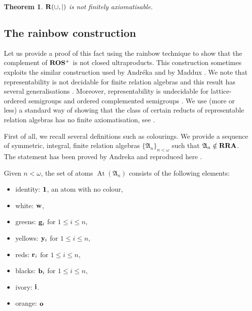\documentclass[a4paper]{article}
\theoremstyle{defin}
\theoremstyle{theorem}
\newtheorem{theorem}{Theorem}
\theoremstyle{prop}
\theoremstyle{lemma}
\theoremstyle{ex}
\theoremstyle{col}
\theoremstyle{claim}
\begin{document}
\begin{theorem}
  ${\bf R}(\cup, |)$ is not finitely axiomatisable.
\end{theorem}

\subsection{The rainbow construction}

Let us provide a proof of this fact using the rainbow technique \cite{hirsch2002relation} to show that the complement of ${\bf ROS^{+}}$ is not closed ultraproducts. This construction sometimes exploits the similar construction used by Andr{\'e}ka \cite{andreka1991representations} and by Maddux \cite{maddux_1989}.
We note that representability is not decidable for finite relation algebras \cite{hirsch2001representability} and this result has several generalisations \cite{hirsch2012undecidability}. Moreover, representability is undecidable for lattice-ordered semigroups and ordered complemented semigroups \cite{neuzerling2016undecidability}. We use (more or less) a standard way of showing that the class of certain reducts of representable relation algebras has no finite axiomatisation, see \cite{hodkinson2000axiomatizability} \cite{hirsch1997step}.

First of all, we recall several definitions such as colourings. We provide a sequence of symmetric, integral, finite relation algebras $\{ \mathfrak{A}_n \}_{n < \omega}$ such that $\mathfrak{A}_n \notin {\bf RRA}$. The statement has been proved by Andreka \cite{andreka1991representations} and reproduced here \cite{andreka2011axiomatizability}.

Given $n < \omega$, the set of atoms $\operatorname{At}(\mathfrak{A}_n)$ consists of the following elements:
\begin{itemize}
\item identity: ${\bf 1}$, an atom with no colour,
\item white: ${\bf w}$,
\item greens: ${\bf g}_i$ for $1 \leq i \leq n$,
\item yellows: ${\bf y}_i$ for $1 \leq i \leq n$,
\item reds: ${\bf r}_i$ for $1 \leq i \leq n$,
\item blacks: ${\bf b}_i$ for $1 \leq i \leq n$,
\item ivory: ${\bf i}$.
\item orange: ${\bf o}$
\end{itemize}
\end{document}
